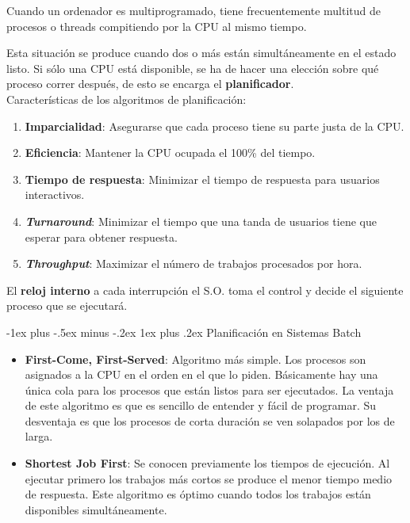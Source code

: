 \documentclass[10pt,portrait, twocolumn]{article}
\makeatletter
\renewcommand{\subsubsection}{\@startsection{subsubsection}{3}{0mm}%
                                {-1ex plus -.5ex minus -.2ex}%
                                {1ex plus .2ex}%
                                {\normalfont\small\bfseries}}
\makeatother
\begin{document}
Cuando un ordenador es multiprogramado, tiene frecuentemente multitud de procesos o threads compitiendo por la CPU al mismo tiempo. 

	\quad Esta situación se produce cuando dos o más están simultáneamente en el estado listo. Si sólo una CPU está disponible, se ha de hacer una elección sobre qué proceso correr después, de esto se encarga el \textbf{planificador}.\\

Características de los algoritmos de planificación:
 
 	\begin{enumerate}
		\item \textbf{Imparcialidad}: Asegurarse que cada proceso tiene su parte justa de la CPU.
		\item \textbf{Eficiencia}: Mantener la CPU ocupada el 100\% del tiempo.
		\item \textbf{Tiempo de respuesta}: Minimizar el tiempo de respuesta para usuarios interactivos.
		\item \textbf{\textit{Turnaround}}: Minimizar el tiempo que una tanda de usuarios tiene que esperar para obtener respuesta.
		\item \textbf{\textit{Throughput}}: Maximizar el número de trabajos procesados por hora.
	\end{enumerate}
	
El \textbf{reloj interno} a cada interrupción el S.O. toma el control y decide el siguiente proceso que se ejecutará.

\subsubsection{Planificación en Sistemas Batch}

\begin{itemize}
	\item \textbf{First-Come, First-Served}: Algoritmo más simple. Los procesos son asignados a la CPU en el orden en el que lo piden. Básicamente hay una única cola para los procesos que están listos para ser ejecutados. La ventaja de este algoritmo es que es sencillo de entender y fácil de programar. Su desventaja es que los procesos de corta duración se ven solapados por los de larga.
	\item \textbf{Shortest Job First}: Se conocen previamente los tiempos de ejecución. Al ejecutar primero los trabajos más cortos se produce el menor tiempo medio de respuesta. Este algoritmo es óptimo cuando todos los trabajos están disponibles simultáneamente.
\end{itemize}
\end{document}
